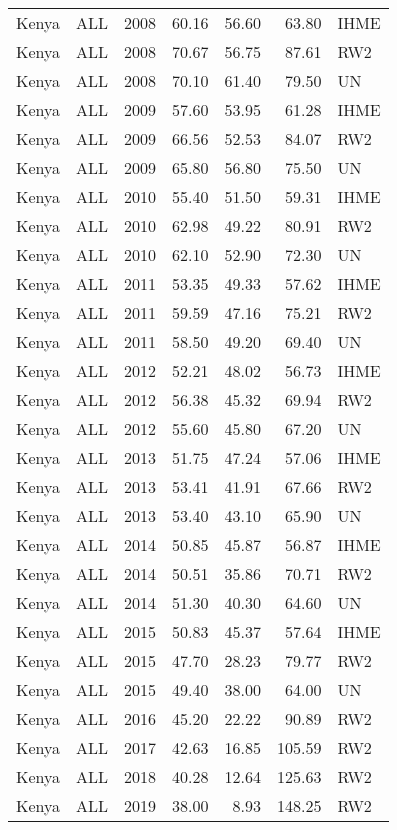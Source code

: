 \begin{longtable}{lllrrrl}
  Kenya & ALL & 2008 & 60.16 & 56.60 & 63.80 & IHME \\ 
  Kenya & ALL & 2008 & 70.67 & 56.75 & 87.61 & RW2 \\ 
  Kenya & ALL & 2008 & 70.10 & 61.40 & 79.50 & UN \\ 
  Kenya & ALL & 2009 & 57.60 & 53.95 & 61.28 & IHME \\ 
  Kenya & ALL & 2009 & 66.56 & 52.53 & 84.07 & RW2 \\ 
  Kenya & ALL & 2009 & 65.80 & 56.80 & 75.50 & UN \\ 
  Kenya & ALL & 2010 & 55.40 & 51.50 & 59.31 & IHME \\ 
  Kenya & ALL & 2010 & 62.98 & 49.22 & 80.91 & RW2 \\ 
  Kenya & ALL & 2010 & 62.10 & 52.90 & 72.30 & UN \\ 
  Kenya & ALL & 2011 & 53.35 & 49.33 & 57.62 & IHME \\ 
  Kenya & ALL & 2011 & 59.59 & 47.16 & 75.21 & RW2 \\ 
  Kenya & ALL & 2011 & 58.50 & 49.20 & 69.40 & UN \\ 
  Kenya & ALL & 2012 & 52.21 & 48.02 & 56.73 & IHME \\ 
  Kenya & ALL & 2012 & 56.38 & 45.32 & 69.94 & RW2 \\ 
  Kenya & ALL & 2012 & 55.60 & 45.80 & 67.20 & UN \\ 
  Kenya & ALL & 2013 & 51.75 & 47.24 & 57.06 & IHME \\ 
  Kenya & ALL & 2013 & 53.41 & 41.91 & 67.66 & RW2 \\ 
  Kenya & ALL & 2013 & 53.40 & 43.10 & 65.90 & UN \\ 
  Kenya & ALL & 2014 & 50.85 & 45.87 & 56.87 & IHME \\ 
  Kenya & ALL & 2014 & 50.51 & 35.86 & 70.71 & RW2 \\ 
  Kenya & ALL & 2014 & 51.30 & 40.30 & 64.60 & UN \\ 
  Kenya & ALL & 2015 & 50.83 & 45.37 & 57.64 & IHME \\ 
  Kenya & ALL & 2015 & 47.70 & 28.23 & 79.77 & RW2 \\ 
  Kenya & ALL & 2015 & 49.40 & 38.00 & 64.00 & UN \\ 
  Kenya & ALL & 2016 & 45.20 & 22.22 & 90.89 & RW2 \\ 
  Kenya & ALL & 2017 & 42.63 & 16.85 & 105.59 & RW2 \\ 
  Kenya & ALL & 2018 & 40.28 & 12.64 & 125.63 & RW2 \\ 
  Kenya & ALL & 2019 & 38.00 & 8.93 & 148.25 & RW2 \\ 

\end{longtable}
